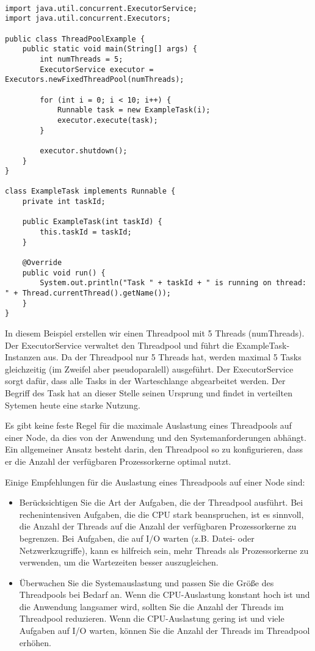\begin{lstlisting}[caption={ExecutorService-Klasse},captionpos=b,label={lst:executor}]

import java.util.concurrent.ExecutorService;
import java.util.concurrent.Executors;

public class ThreadPoolExample {
    public static void main(String[] args) {
        int numThreads = 5;
        ExecutorService executor = Executors.newFixedThreadPool(numThreads);

        for (int i = 0; i < 10; i++) {
            Runnable task = new ExampleTask(i);
            executor.execute(task);
        }

        executor.shutdown();
    }
}

class ExampleTask implements Runnable {
    private int taskId;

    public ExampleTask(int taskId) {
        this.taskId = taskId;
    }

    @Override
    public void run() {
        System.out.println("Task " + taskId + " is running on thread: " + Thread.currentThread().getName());
    }
}
\end{lstlisting}
In diesem Beispiel erstellen wir einen Threadpool mit 5 Threads (numThreads). Der ExecutorService verwaltet den Threadpool und führt die ExampleTask-Instanzen aus. Da der Threadpool nur 5 Threads hat, werden maximal 5 Tasks gleichzeitig (im Zweifel aber pseudoparalell) ausgeführt. Der ExecutorService sorgt dafür, dass alle Tasks in der Warteschlange abgearbeitet werden. Der Begriff des Task hat an dieser Stelle seinen Ursprung und findet in verteilten Sytemen heute eine starke Nutzung.


Es gibt keine feste Regel für die maximale Auslastung eines Threadpools auf einer Node, da dies von der Anwendung und den Systemanforderungen abhängt. Ein allgemeiner Ansatz besteht darin, den Threadpool so zu konfigurieren, dass er die Anzahl der verfügbaren Prozessorkerne optimal nutzt.

Einige Empfehlungen für die Auslastung eines Threadpools auf einer Node sind:
\begin{itemize}
\item Berücksichtigen Sie die Art der Aufgaben, die der Threadpool ausführt. Bei rechenintensiven Aufgaben, die die CPU stark beanspruchen, ist es sinnvoll, die Anzahl der Threads auf die Anzahl der verfügbaren Prozessorkerne zu begrenzen. Bei Aufgaben, die auf I/O warten (z.B. Datei- oder Netzwerkzugriffe), kann es hilfreich sein, mehr Threads als Prozessorkerne zu verwenden, um die Wartezeiten besser auszugleichen.
\item Überwachen Sie die Systemauslastung und passen Sie die Größe des Threadpools bei Bedarf an. Wenn die CPU-Auslastung konstant hoch ist und die Anwendung langsamer wird, sollten Sie die Anzahl der Threads im Threadpool reduzieren. Wenn die CPU-Auslastung gering ist und viele Aufgaben auf I/O warten, können Sie die Anzahl der Threads im Threadpool erhöhen.
\end{itemize}

